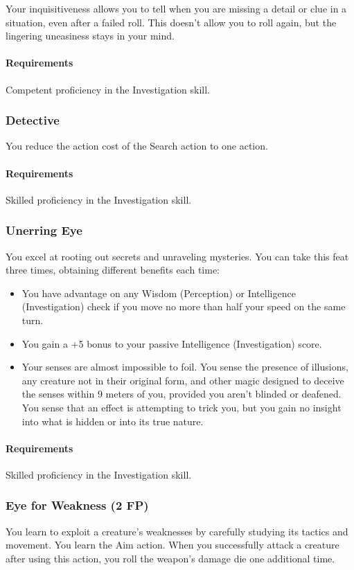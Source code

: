     Your inquisitiveness allows you to tell when you are missing a detail or clue in a situation, even after a failed roll.
    This doesn't allow you to roll again, but the lingering uneasiness stays in your mind.
    \paragraph{Requirements} Competent proficiency in the Investigation skill.
\subsubsection{Detective} \label{feat::detective}
    You reduce the action cost of the Search action to one action.
    \paragraph{Requirements} Skilled proficiency in the Investigation skill.
\subsubsection{Unerring Eye} \label{feat::unerringeye}
    You excel at rooting out secrets and unraveling mysteries.
    You can take this feat three times, obtaining different benefits each time:
    \begin{itemize}
        \item You have advantage on any Wisdom (Perception) or Intelligence (Investigation) check if you move no more than half your speed on the same turn.
        \item You gain a +5 bonus to your passive Intelligence (Investigation) score.
        \item Your senses are almost impossible to foil.
        You sense the presence of illusions, any creature not in their original form, and other magic designed to deceive the senses within 9 meters of you, provided you aren't blinded or deafened.
        You sense that an effect is attempting to trick you, but you gain no insight into what is hidden or into its true nature.
    \end{itemize}
    \paragraph{Requirements} Skilled proficiency in the Investigation skill.
\subsubsection{Eye for Weakness (2 FP)} \label{feat::eyeforweakness}
    You learn to exploit a creature's weaknesses by carefully studying its tactics and movement.
    You learn the Aim action.
    When you successfully attack a creature after using this action, you roll the weapon's damage die one additional time.
